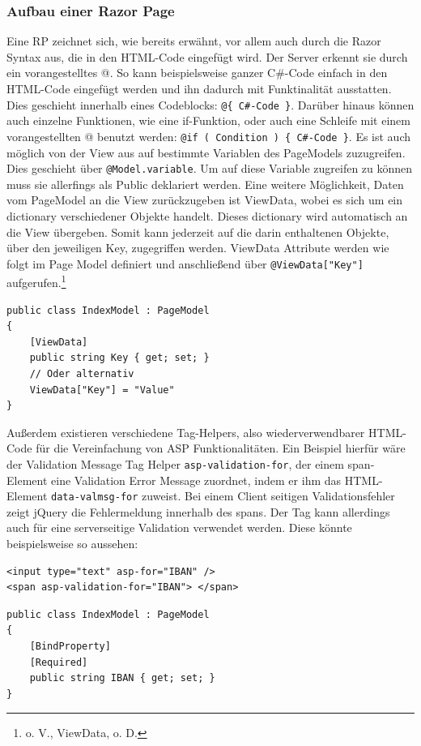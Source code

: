 \documentclass[a4paper,
12pt,
oneside]
{article}
\begin{document}
	\subsubsection{Aufbau einer Razor Page}
	Eine RP zeichnet sich, wie bereits erwähnt, vor allem auch durch die Razor Syntax aus, die in den HTML-Code eingefügt wird. Der Server erkennt sie durch ein vorangestelltes \glqq @\grqq. So kann beispielsweise ganzer C\#-Code einfach in den HTML-Code eingefügt werden und ihn dadurch mit Funktinalität ausstatten. Dies geschieht innerhalb eines Codeblocks: \texttt{@\{ C\#-Code \}}. Darüber hinaus können auch einzelne Funktionen, wie eine if-Funktion, oder auch eine Schleife mit einem vorangestellten @ benutzt werden: \texttt{@if ( Condition ) \{ C\#-Code \}}. Es ist auch möglich von der View aus auf bestimmte Variablen des PageModels zuzugreifen. Dies geschieht über \texttt{@Model.variable}. Um auf diese Variable zugreifen zu können muss sie allerfings als Public deklariert werden. Eine weitere Möglichkeit, Daten vom PageModel an die View zurückzugeben ist ViewData, wobei es sich um ein dictionary verschiedener Objekte handelt. Dieses dictionary wird automatisch an die View übergeben. Somit kann jederzeit auf die darin enthaltenen Objekte, über den jeweiligen Key, zugegriffen werden. ViewData Attribute werden wie folgt im Page Model definiert und anschließend über \texttt{@ViewData["Key"]} aufgerufen.\footnote{o. V., ViewData, o. D.}
	\lstset{style=csharp}
	\begin{lstlisting}
public class IndexModel : PageModel
{
	[ViewData]
	public string Key { get; set; }
	// Oder alternativ
	ViewData["Key"] = "Value"
}
	\end{lstlisting}
	Außerdem existieren verschiedene Tag-Helpers, also wiederverwendbarer HTML-Code für die Vereinfachung von ASP Funktionalitäten. Ein Beispiel hierfür wäre der Validation Message Tag Helper \texttt{asp-validation-for}, der einem span-Element eine Validation Error Message zuordnet, indem er ihm das HTML-Element \texttt{data-valmsg-for} zuweist. Bei einem Client seitigen Validationsfehler zeigt jQuery die Fehlermeldung innerhalb des spans. Der Tag kann allerdings auch für eine serverseitige Validation verwendet werden. Diese könnte beispielsweise so aussehen: 
	\lstset{style=cshtml}
	\begin{lstlisting}
<input type="text" asp-for="IBAN" />
<span asp-validation-for="IBAN"> </span>
	\end{lstlisting}
	\lstset{style=csharp}
	\begin{lstlisting}
public class IndexModel : PageModel
{
	[BindProperty]
	[Required]
	public string IBAN { get; set; }
}
	\end{lstlisting}
\end{document}
